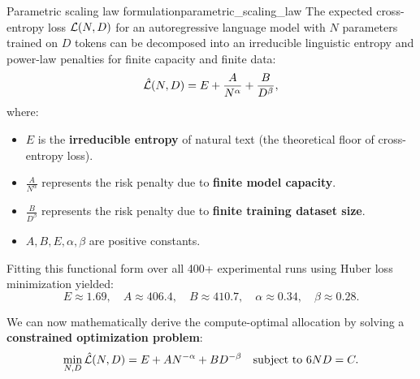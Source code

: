 \documentclass[../../main.tex]{subfiles}
\begin{document}
\begin{theorem}{Parametric scaling law formulation}{parametric_scaling_law}
The expected cross-entropy loss $\mathcal{L}(N, D)$ for an autoregressive language model with $N$ parameters trained on $D$ tokens can be decomposed into an irreducible linguistic entropy and power-law penalties for finite capacity and finite data:
\begin{equation}
\label{eq:chinchilla_parametric_loss}
\hat{\mathcal{L}}(N, D) = E + \frac{A}{N^\alpha} + \frac{B}{D^\beta},
\end{equation}
where:
\begin{itemize}
    \item $E$ is the \textbf{irreducible entropy} of natural text (the theoretical floor of cross-entropy loss).
    \item $\frac{A}{N^\alpha}$ represents the risk penalty due to \textbf{finite model capacity}.
    \item $\frac{B}{D^\beta}$ represents the risk penalty due to \textbf{finite training dataset size}.
    \item $A, B, E, \alpha, \beta$ are positive constants.
\end{itemize}
\end{theorem}

Fitting this functional form over all 400+ experimental runs using Huber loss minimization yielded:
\begin{equation}
\label{eq:chinchilla_fitted_parameters}
E \approx 1.69, \quad A \approx 406.4, \quad B \approx 410.7, \quad \alpha \approx 0.34, \quad \beta \approx 0.28.
\end{equation}

We can now mathematically derive the compute-optimal allocation by solving a \textbf{constrained optimization problem}:
\begin{equation}
\min_{N, D} \hat{\mathcal{L}}(N, D) = E + A N^{-\alpha} + B D^{-\beta} \quad \text{subject to } 6ND = C.
\end{equation}
\end{document}
